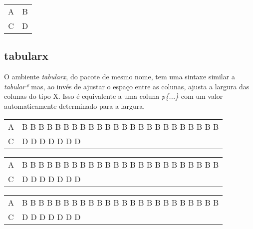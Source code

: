 \documentclass[brazilian, 12pt]{article}
\begin{document}
\vspace{10pt}

\begin{center}
\begin{tabular*}{\textwidth}{@{\extracolsep{\fill}}cc@{}}
\hline
A & B\\
C & D\\
\hline
\end{tabular*}
\end{center}

\vspace{10pt}

\subsection{tabularx}

O ambiente \emph{tabularx}, do pacote de mesmo nome, tem uma sintaxe similar a \emph{tabular*} mas, ao invés de ajustar o espaço entre as colunas, ajusta a largura das colunas do tipo X. Isso é equivalente a uma coluna \emph{p\{...\}} com um valor automaticamente determinado para a largura.

\begin{center}
\begin{tabular}{lp{2cm}}
    \hline
    A & B B B B B B B B B B B B B B B B B B B B B B B B\\
    C & D D D D D D D\\
    \hline
\end{tabular}
\end{center}

\vspace{10pt}

\begin{center}
\begin{tabularx}{0.5\textwidth}{lX}
    \hline
    A & B B B B B B B B B B B B B B B B B B B B B B B B\\
    C & D D D D D D D\\
    \hline
\end{tabularx}
\end{center}

\vspace{10pt}

\begin{center}
\begin{tabularx}{\textwidth}{lX}
    \hline
    A & B B B B B B B B B B B B B B B B B B B B B B B B\\
    C & D D D D D D D\\
    \hline
\end{tabularx}
\end{center}
\end{document}
